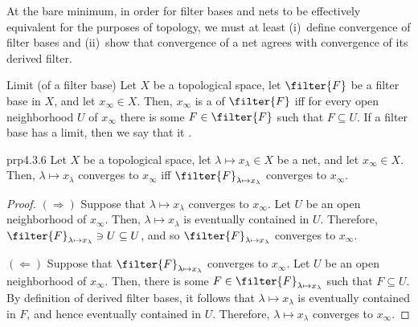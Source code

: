 At the bare minimum, in order for filter bases and nets to be effectively equivalent for the purposes of topology, we must at least (i)~define convergence of filter bases and (ii)~show that convergence of a net agrees with convergence of its derived filter.
\begin{dfn}{Limit (of a filter base)}{}
Let $X$ be a topological space, let $\filter{F}$ be a filter base in $X$, and let $x_\infty \in X$.  Then, $x_\infty$ is a  of $\filter{F}$ iff for every open neighborhood $U$ of $x_\infty$ there is some $F\in \filter{F}$ such that $F\subseteq U$.  If a filter base has a limit, then we say that it .
\end{dfn}
\begin{prp}{}{prp4.3.6}
Let $X$ be a topological space, let $\lambda \mapsto x_\lambda \in X$ be a net, and let $x_\infty \in X$.  Then, $\lambda \mapsto x_\lambda$ converges to $x_\infty$ iff $\filter{F}_{\lambda \mapsto x_\lambda}$ converges to $x_\infty$.
\begin{proof}
$(\Rightarrow )$ Suppose that $\lambda \mapsto x_\lambda$ converges to $x_\infty$.  Let $U$ be an open neighborhood of $x_\infty$.  Then, $\lambda \mapsto x_\lambda$ is eventually contained in $U$.  Therefore, $\filter{F}_{\lambda \mapsto x_{\lambda}}\ni U\subseteq U$, and so $\filter{F}_{\lambda \mapsto x_\lambda}$ converges to $x_\infty$.

\blankline
\noindent
$(\Leftarrow )$ Suppose that $\filter{F}_{\lambda \mapsto x_\lambda}$ converges to $x_\infty$.  Let $U$ be an open neighborhood of $x_\infty$.  Then, there is some $F\in \filter{F}_{\lambda \mapsto x_\lambda}$ such that $F\subseteq U$.  By definition of derived filter bases, it follows that $\lambda \mapsto x_\lambda$ is eventually contained in $F$, and hence eventually contained in $U$.  Therefore, $\lambda \mapsto x_\lambda$ converges to $x_\infty$.
\end{proof}
\end{prp}

